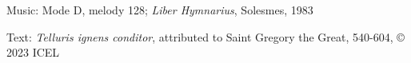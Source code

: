 

\begin{hymnsource}
Music: Mode D, melody 128; \emph{Liber Hymnarius}, Solesmes, 1983

Text: \emph{Telluris ignens conditor}, attributed to Saint Gregory the Great, 540-604, © 2023 ICEL
\end{hymnsource}

